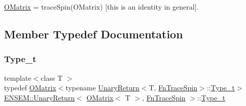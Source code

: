 \mbox{\hyperlink{classENSEM_1_1OMatrix}{O\+Matrix}} = trace\+Spin(\+O\+Matrix) \mbox{[}this is an identity in general\mbox{]}. 

\subsection{Member Typedef Documentation}
\mbox{\label{structENSEM_1_1UnaryReturn_3_01OMatrix_3_01T_01_4_00_01FnTraceSpin_01_4_a9d6cbecc05de075e41d52fd0b7f2b55e}} 
\subsubsection{\texorpdfstring{Type\_t}{Type\_t}\hspace{0.1cm}{\footnotesize\ttfamily [1/2]}}
{\footnotesize\ttfamily template$<$class T $>$ \\
typedef \mbox{\hyperlink{classENSEM_1_1OMatrix}{O\+Matrix}}$<$typename \mbox{\hyperlink{structENSEM_1_1UnaryReturn}{Unary\+Return}}$<$T, \mbox{\hyperlink{structENSEM_1_1FnTraceSpin}{Fn\+Trace\+Spin}}$>$\+::\mbox{\hyperlink{structENSEM_1_1UnaryReturn_3_01OMatrix_3_01T_01_4_00_01FnTraceSpin_01_4_a9d6cbecc05de075e41d52fd0b7f2b55e}{Type\+\_\+t}}$>$ \mbox{\hyperlink{structENSEM_1_1UnaryReturn}{E\+N\+S\+E\+M\+::\+Unary\+Return}}$<$ \mbox{\hyperlink{classENSEM_1_1OMatrix}{O\+Matrix}}$<$ T $>$, \mbox{\hyperlink{structENSEM_1_1FnTraceSpin}{Fn\+Trace\+Spin}} $>$\+::\mbox{\hyperlink{structENSEM_1_1UnaryReturn_3_01OMatrix_3_01T_01_4_00_01FnTraceSpin_01_4_a9d6cbecc05de075e41d52fd0b7f2b55e}{Type\+\_\+t}}}

\mbox{\label{structENSEM_1_1UnaryReturn_3_01OMatrix_3_01T_01_4_00_01FnTraceSpin_01_4_a9d6cbecc05de075e41d52fd0b7f2b55e}} 
